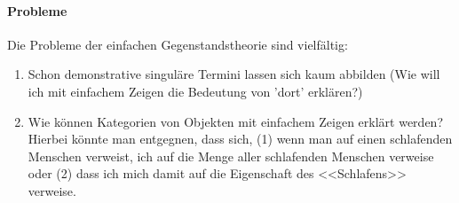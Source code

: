 \documentclass[../main.tex]{subfiles}
\begin{document}
\paragraph{Probleme} Die Probleme der einfachen Gegenstandstheorie sind vielfältig:
\begin{enumerate}
	\item Schon demonstrative singuläre Termini lassen sich kaum abbilden (Wie will ich mit einfachem Zeigen die Bedeutung von 'dort' erklären?)
	\item Wie können Kategorien von Objekten mit einfachem Zeigen erklärt werden? Hierbei könnte man entgegnen, dass sich, (1) wenn man auf einen schlafenden Menschen verweist, ich auf die Menge aller schlafenden Menschen verweise oder (2) dass ich mich damit auf die Eigenschaft des <<Schlafens>> verweise.
\end{enumerate}
\end{document}
